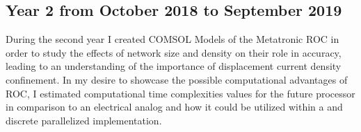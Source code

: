 \subsection{Year 2 from October 2018 to September 2019}
\par During the second year I created COMSOL Models of the Metatronic ROC in order to study the effects of network size and density on their role in accuracy, leading to an understanding of the importance of \gls{displacement current density} confinement. In my desire to showcase the possible computational advantages of ROC, I estimated computational time complexities values for the future processor in comparison to an electrical analog and how it could be utilized within a and discrete parallelized implementation.

